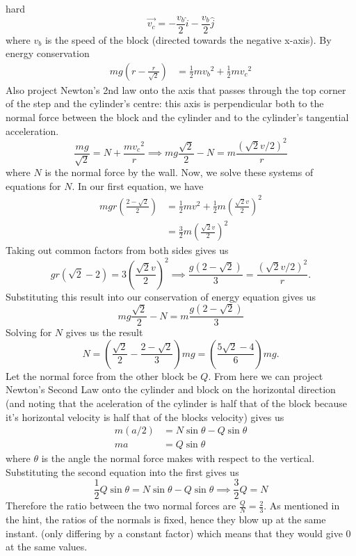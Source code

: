 \begin{solution}{hard}
\[\vec{v_{c}} = -\frac{v_b}{2} \hat{i} - \frac{v_b}{2} \hat{j}\]where $v_b$ is the speed of the block (directed towards the negative x-axis). By energy conservation
\begin{align*}
{mg}\left(r-\frac{r}{\sqrt{2}}\right) &= \frac{1}{2} m {v_b}^2 + \frac{1}{2} m {v_c}^2
\end{align*}
Also project Newton’s 2nd law onto the axis that passes through the top corner of the step and the cylinder’s centre: this axis is perpendicular both to the normal force between the block and the cylinder and to the cylinder’s tangential acceleration.
\[\frac{mg}{\sqrt{2}} = N + \frac{m{v_c}^2}{r}\implies mg\frac{\sqrt{2}}{2} -N = m\frac{(\sqrt{2}v/2)^2}{r}\]
where $N$ is the normal force by the wall. Now, we solve these systems of equations for $N$. In our first equation, we have 
\begin{align*}
mgr\left(\frac{2-\sqrt{2}}{2}\right)&= \frac{1}{2}mv^2 + \frac{1}{2}m\left(\frac{\sqrt{2}v}{2}\right)^2\\
&=\frac{3}{2}m\left(\frac{\sqrt{2}v}{2}\right)^2
\end{align*}
Taking out common factors from both sides gives us 
\[gr(\sqrt{2}-2) = 3\left(\frac{\sqrt{2}v}{2}\right)^2\implies \frac{g(2-\sqrt{2})}{3} = \frac{(\sqrt{2}v/2)^2}{r}.\]
Substituting this result into our conservation of energy equation gives us 
\[mg\frac{\sqrt{2}}{2} -N = m\frac{g(2-\sqrt{2})}{3}\]
Solving for $N$ gives us the result 
\[N = \left(\frac{\sqrt{2}}{2} - \frac{2-\sqrt{2}}{3}\right)mg = \boxed{\left(\frac{5\sqrt{2} - 4}{6}\right)mg}.\]
Let the normal force from the other block be $Q$. From here we can project Newton's Second Law onto the cylinder and block on the horizontal direction (and noting that the aceleration of the cylinder is half that of the block because it's horizontal velocity is half that of the blocks velocity) gives us
\begin{align*}
m(a/2) &= N\sin\theta - Q\sin\theta\\
ma &= Q\sin\theta
\end{align*}
where $\theta$ is the angle the normal force makes with respect to the vertical. Substituting the second equation into the first gives us 
\[\frac{1}{2}Q\sin\theta = N\sin\theta - Q\sin\theta\implies \frac{3}{2}Q = N\]
Therefore the ratio between the two normal forces are $\frac{Q}{N} = \frac{2}{3}$. As mentioned in the hint, the ratios of the normals is fixed, hence they blow up at the same instant. (only differing by a constant factor) which means that they would give $0$ at the same values.
\end{solution}
